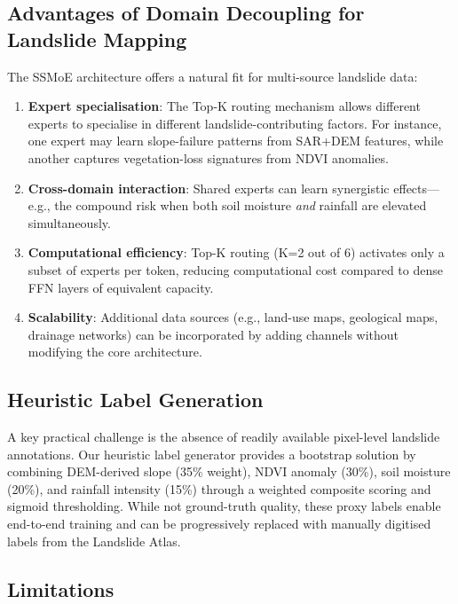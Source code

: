 \documentclass[conference]{IEEEtran}
\begin{document}
\subsection{Advantages of Domain Decoupling for Landslide Mapping}

The SSMoE architecture offers a natural fit for multi-source landslide data:

\begin{enumerate}
    \item \textbf{Expert specialisation}: The Top-K routing mechanism allows different experts to specialise in different landslide-contributing factors. For instance, one expert may learn slope-failure patterns from SAR+DEM features, while another captures vegetation-loss signatures from NDVI anomalies.
    
    \item \textbf{Cross-domain interaction}: Shared experts can learn synergistic effects—e.g., the compound risk when both soil moisture \textit{and} rainfall are elevated simultaneously.
    
    \item \textbf{Computational efficiency}: Top-K routing (K=2 out of 6) activates only a subset of experts per token, reducing computational cost compared to dense FFN layers of equivalent capacity.
    
    \item \textbf{Scalability}: Additional data sources (e.g., land-use maps, geological maps, drainage networks) can be incorporated by adding channels without modifying the core architecture.
\end{enumerate}

\subsection{Heuristic Label Generation}

A key practical challenge is the absence of readily available pixel-level landslide annotations. Our heuristic label generator provides a bootstrap solution by combining DEM-derived slope (35\% weight), NDVI anomaly (30\%), soil moisture (20\%), and rainfall intensity (15\%) through a weighted composite scoring and sigmoid thresholding. While not ground-truth quality, these proxy labels enable end-to-end training and can be progressively replaced with manually digitised labels from the Landslide Atlas.

\subsection{Limitations}
\end{document}
